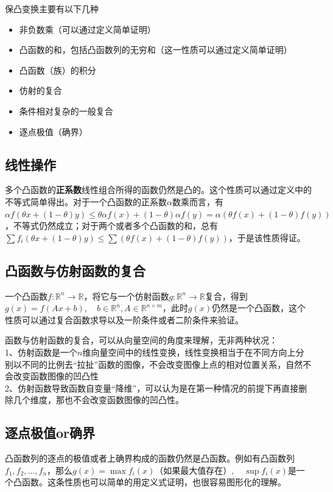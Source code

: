 \documentclass[12pt,a4paper]{book}
\begin{document}
保凸变换主要有以下几种
\begin{itemize}
    \item 非负数乘（可以通过定义简单证明）
    \item 凸函数的和，包括凸函数列的无穷和（这一性质可以通过定义简单证明）
    \item 凸函数（族）的积分
    \item 仿射的复合
    \item 条件相对复杂的一般复合
    \item 逐点极值（确界）
\end{itemize}

\subsection{线性操作}

多个凸函数的\textbf{正系数}线性组合所得的函数仍然是凸的。这个性质可以通过定义中的不等式简单得出。对于一个凸函数的正系数$\alpha$数乘而言，有$\alpha f(\theta x +(1-\theta)y)\leq  \theta \alpha f(x) + (1-\theta)\alpha f(y) = \alpha (\theta f(x) + (1-\theta)f(y))$，不等式仍然成立；对于两个或者多个凸函数的和，总有$\sum f_i(\theta x +(1-\theta)y) \leq \sum (\theta f(x) + (1-\theta)f(y))$，于是该性质得证。

\subsection{凸函数与仿射函数的复合}

一个凸函数$f:\mathbb{R}^n\to\mathbb{R}$，将它与一个仿射函数$g:\mathbb{R}^n\to\mathbb{R}$复合，得到$g(x) = f(Ax + b),\quad b\in\mathbb{R}^n,A\in\mathbb{R}^{n\times m}$，此时$g(x)$仍然是一个凸函数，这个性质可以通过复合函数求导以及一阶条件或者二阶条件来验证。

函数与仿射函数的复合，可以从向量空间的角度来理解，无非两种状况：\\1、仿射函数是一个$n$维向量空间中的线性变换，线性变换相当于在不同方向上分别以不同的比例去“拉扯”函数的图像，不会改变图像上点的相对位置关系，自然不会改变函数图像的凹凸性\\2、仿射函数导致函数自变量“降维”，可以认为是在第一种情况的前提下再直接删除几个维度，那也不会改变函数图像的凹凸性。

\subsection{逐点极值or确界}

凸函数列的逐点的极值或者上确界构成的函数仍然是凸函数。例如有凸函数列$f_1,f_2,\ldots,f_n$，那么$g(x) = \max{f_i(x)}\text{（如果最大值存在）},\quad \sup{f_i(x)}$是一个凸函数。这条性质也可以简单的用定义式证明，也很容易图形化的理解。
\end{document}
